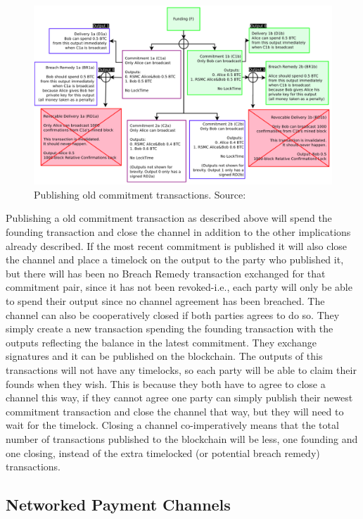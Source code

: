 \begin{figure}[ht]
    \centering
    \includegraphics[width=14cm]{figures/ln_breach.png}
    \caption{Publishing old commitment transactions. Source:~\cite{poon2015bitcoin}}
    \label{fig:ln_breach}
\end{figure}

Publishing a old commitment transaction as described above will spend the founding transaction and close the channel in addition to the other implications already described. If the most recent commitment is published it will also close the channel and place a timelock on the output to the party who published it, but there will has been no Breach Remedy transaction exchanged for that commitment pair, since it has not been revoked-i.e., each party will only be able to spend their output since no channel agreement has been breached.
The channel can also be cooperatively closed if both parties agrees to do so. They simply create a new transaction spending the founding transaction with the outputs reflecting the balance in the latest commitment. They exchange signatures and it can be published on the blockchain. The outputs of this transactions will not have any timelocks, so each party will be able to claim their founds when they wish.
This is because they both have to agree to close a channel this way, if they cannot agree one party can simply publish their newest commitment transaction and close the channel that way, but they will need to wait for the timelock.
Closing a channel co-imperatively means that the total number of transactions published to the blockchain will be less, one founding and one closing, instead of the extra timelocked (or potential breach remedy) transactions.

\subsection{Networked Payment Channels}
\label{subsec:networkpcln}

